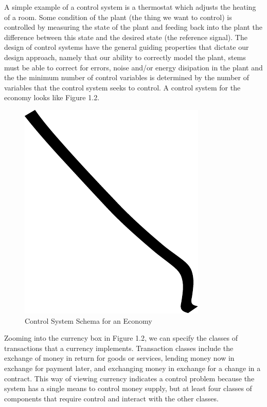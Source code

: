 A simple example of a control system is a thermostat which adjusts the heating of a room. Some
condition of the plant (the thing we want to control) is controlled by measuring the state of the
plant and feeding back into the plant the difference between this state and the desired state (the
reference signal). The design of control systems have the general guiding properties that dictate
our design approach, namely that our ability to correctly model the plant, stems must be able to
correct for errors, noise and/or energy disipation in the plant and the the minimum number of
control variables is determined by the number of variables that the control system seeks to control.
A control system for the economy looks like Figure 1.2.

\begin{figure}
\centering
\includegraphics{img/example.pdf}
\caption{Control System Schema for an Economy}
\end{figure}

Zooming into the currency box in Figure 1.2, we can specify the classes of transactions that a
currency implements. Transaction classes include the exchange of money in return for goods or
services, lending money now in exchange for payment later, and exchanging money in exchange for a
change in a contract. This way of viewing currency indicates a control problem because the system
has a single means to control money supply, but at least four classes of components that require
control and interact with the other classes.

